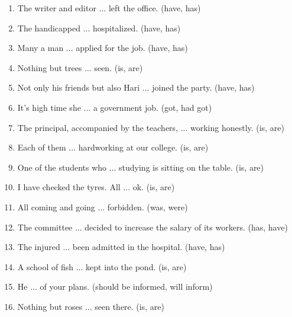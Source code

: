 \documentclass[12pt]{article}
\begin{document}
  \begin{enumerate}
  \subsection{Subject Verb Agreement}
    \item The writer and editor ... left the office. \hfill (have, has)

    \item The handicapped ... hospitalized. \hfill (have, has)

    \item Many a man ... applied for the job. \hfill (have, has)

    \item Nothing but trees ... seen. \hfill  (is, are)

    \item Not only his friends but also Hari ... joined the party. \hfill (have, has)

    \item It's high time she ... a government job. \hfill (got, had got)

    \item The principal, accompanied by the teachers, ... working honestly. \hfill (is, are)

    \item Each of them ... hardworking at our college. \hfill (is, are)

    \item One of the students who ... studying is sitting on the table. \hfill (is, are)

    \item I have checked the tyres. All ... ok. \hfill (is, are)

    \item All coming and going ... forbidden. \hfill (was, were)

    \item The committee ... decided to increase the salary of its workers. \hfill (has, have)

    \item The injured ... been admitted in the hospital. \hfill (have, has)

    \item A school of fish ... kept into the pond. \hfill (is, are)

    \item He ... of your plans. \hfill (should be informed, will inform)

    \item Nothing but roses ... seen there. \hfill (is, are)


\end{enumerate}
\end{document}
